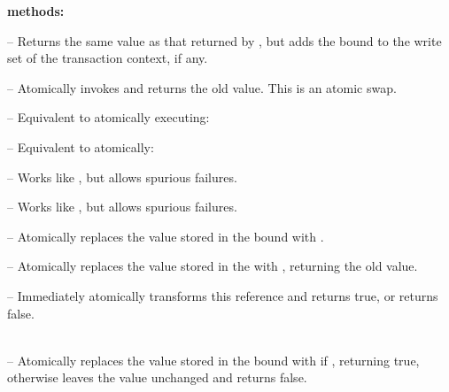 \textbf{ methods:}
\begin{packed_itemize}

\item {} -- Returns the same value as
that returned by , but adds the bound  to the write
set of the transaction context, if any.

\item {} -- Atomically
invokes  and returns the old value.  This is an atomic swap.

\item {}
-- Equivalent to atomically executing:
\code{ \}}

\item {}
-- Equivalent to atomically:
\code{ \}}

\item {}
-- Works like , but allows spurious failures.

\item {}
-- Works like , but allows spurious failures.

\item {} --
Atomically replaces the value  stored in the bound 
with .

\item {}
-- Atomically replaces the value  stored in the 
with , returning the old value.

\item {} 
-- Immediately atomically transforms this reference and returns true,
or returns false.

\item \code{transformIfDefined(pf: PartialFunction[}\typeparam{T}{]):} \\
-- Atomically replaces the value  stored in the bound 
with  if , returning true, otherwise
leaves the value unchanged and returns false.

\end{packed_itemize}

